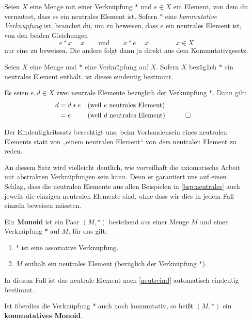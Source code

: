 \begin{bem}
    Seien $X$ eine Menge mit einer Verknüpfung $*$ und $e\in X$ ein Element, von dem du vermutest, dass es ein neutrales Element ist. Sofern $*$ eine \emph{kommutative Verknüpfung} ist, brauchst du, um zu beweisen, dass $e$ ein neutrales Element ist, von den beiden Gleichungen
        \[ e*x=x \qquad\text{und}\qquad x*e=x \qquad\qquad x\in X \]
    nur eine zu beweisen. Die andere folgt dann ja direkt aus dem Kommutativgesetz.
\end{bem}


\begin{satz} \label{neutreind}
    Seien $X$ eine Menge und $*$ eine Verknüpfung auf $X$. Sofern $X$ bezüglich $*$ ein neutrales Element enthält, ist dieses eindeutig bestimmt.
\end{satz}
 

\begin{bew}
    Es seien $e,d\in X$ zwei neutrale Elemente bezüglich der Verknüpfung $*$. Dann gilt:
    \begin{align*}
        d & = d*e && (\text{weil $e$ neutrales Element}) \\
        & = e && (\text{weil $d$ neutrales Element}) && \qed
    \end{align*}
\end{bew}


\begin{bem}
    Der Eindeutigkeitssatz berechtigt uns, beim Vorhandensein eines neutralen Elements statt von „einem neutralen Element“ von \emph{dem} neutralen Element zu reden.
    
    An diesem Satz wird vielleicht deutlich, wie vorteilhaft die axiomatische Arbeit mit abstrakten Verknüpfungen sein kann. Denn er garantiert uns auf einen Schlag, dass die neutralen Elemente aus allen Beispielen in \cref{bsp:neutrales} auch jeweils die einzigen neutralen Elemente sind, ohne dass wir dies in jedem Fall einzeln beweisen müssten.
\end{bem}


\begin{defin}[Monoid] 
    Ein \textbf{Monoid} ist ein Paar $(M,*)$ bestehend aus einer Menge $M$ und einer Verknüpfung $*$ auf $M$, für das gilt:
    \begin{enumerate}[(M1), labelindent=1.5em, leftmargin=*]
        \item $*$ ist eine assoziative Verknüpfung.
        \item $M$ enthält ein neutrales Element (bezüglich der Verknüpfung $*$).
    \end{enumerate}
    In diesem Fall ist das neutrale Element nach \cref{neutreind} automatisch eindeutig bestimmt.
    
    Ist überdies die Verknüpfung $*$ auch noch kommutativ, so heißt $(M,*)$ ein \textbf{kommutatives Monoid}.
\end{defin}


